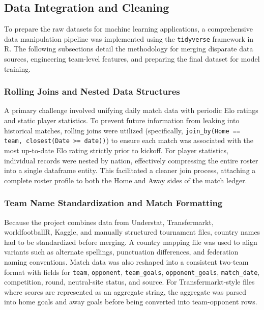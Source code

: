 \documentclass[11pt]{article}
\begin{document}
\subsection{Data Integration and Cleaning}

To prepare the raw datasets for machine learning applications, a comprehensive data manipulation pipeline was implemented using the \texttt{tidyverse} framework in R. The following subsections detail the methodology for merging disparate data sources, engineering team-level features, and preparing the final dataset for model training.

\subsubsection{Rolling Joins and Nested Data Structures}
\label{subsec:rolling_joins}
A primary challenge involved unifying daily match data with periodic Elo ratings and static player statistics. To prevent future information from leaking into historical matches, rolling joins were utilized (specifically, \texttt{join\_by(Home == team, closest(Date >= date))}) to ensure each match was associated with the most up-to-date Elo rating strictly prior to kickoff. For player statistics, individual records were nested by nation, effectively compressing the entire roster into a single dataframe entity. This facilitated a cleaner join process, attaching a complete roster profile to both the Home and Away sides of the match ledger.

\subsubsection{Team Name Standardization and Match Formatting}
\label{subsec:name_standardization}
Because the project combines data from Understat, Transfermarkt, worldfootballR, Kaggle, and manually structured tournament files, country names had to be standardized before merging. A country mapping file was used to align variants such as alternate spellings, punctuation differences, and federation naming conventions. Match data was also reshaped into a consistent two-team format with fields for \texttt{team}, \texttt{opponent}, \texttt{team\_goals}, \texttt{opponent\_goals}, \texttt{match\_date}, competition, round, neutral-site status, and source. For Transfermarkt-style files where scores are represented as an aggregate string, the aggregate was parsed into home goals and away goals before being converted into team-opponent rows.
\end{document}
